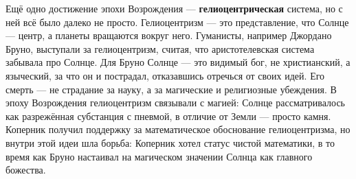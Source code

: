 
Ещё одно достижение эпохи Возрождения --- \textbf{гелиоцентрическая} система, но с ней всё было далеко не просто. Гелиоцентризм --- это представление, что Солнце --- центр, а планеты вращаются вокруг него. Гуманисты, например Джордано Бруно, выступали за гелиоцентризм, считая, что аристотелевская система забывала про Солнце. Для Бруно Солнце --- это видимый бог, не христианский, а языческий, за что он и пострадал, отказавшись отречься от своих идей. Его смерть --- не страдание за науку, а за магические и религиозные убеждения.
В эпоху Возрождения гелиоцентризм связывали с магией: Солнце рассматривалось как разрежённая субстанция с пневмой, в отличие от Земли --- просто камня. Коперник получил поддержку за математическое обоснование гелиоцентризма, но внутри этой идеи шла борьба: Коперник хотел статус чистой математики, в то время как Бруно настаивал на магическом значении Солнца как главного божества.

